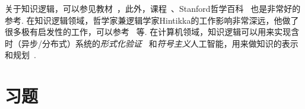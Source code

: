 \begin{remark}
    关于知识逻辑，可以参见教材~\cite{faginReasoningKnowledge2003}，此外，课程~\cite{WangYanJingEpistemicLogic,WangYanJingKnowingThat}、Stanford哲学百科~\cite{rendsvigEpistemicLogic2024} 也是非常好的参考. 在知识逻辑领域，哲学家兼逻辑学家Hintikka的工作影响非常深远，他做了很多极有启发性的工作，可以参考~\cite{hintikkaREASONINGKNOWLEDGEPHILOSOPHY1986,hendricksHintikkaEpistemologicalAxiomatizations2004,sanduShortOverviewDevelopment2018} 等. 在计算机领域，知识逻辑可以用来实现含时（异步/分布式）系统的\textit{形式化验证}~\cite{lamportTLAHomePage,queilleSpecificationVerificationConcurrent1982,emersonCharacterizingCorrectnessProperties1980,clarkeDesignSynthesisSynchronization1981} 和\textit{符号主义}人工智能，用来做知识的表示和规划~\cite{halpernKnowledgeCommonKnowledge1990,liDynamicEpistemicFramework2019,liMoreFreeDynamic2017,liPlanningbasedKnowingHow2021}.
\end{remark}

\section{习题}

